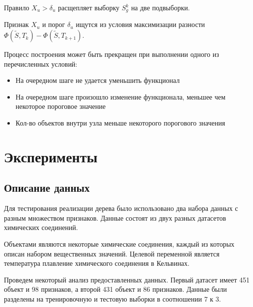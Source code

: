 \documentclass{article}
\begin{document}
Правило $X_u > \delta_u$ расщепляет выборку $S_g^k$ на две подвыборки.

Признак $X_u$ и порог $\delta_u$ ищутся из условия максимизации разности $\Phi(\tilde{S}, T_k) - \Phi(\tilde{S}, T_{k + 1})$.

Процесс построения может быть прекращен при выполнении одного из перечисленных условий:

\begin{itemize}
	\item На очередном шаге не удается уменьшить функционал
	\item На очередном шаге произошло изменение функционала, меньшее чем некоторое пороговое значение
	\item Кол-во объектов внутри узла меньше некоторого порогового значения
\end{itemize}


\section{Эксперименты}
\label{sec:headings}

\subsection{Описание данных}

Для тестирования реализации дерева было использовано два набора данных с разным множеством признаков. Данные состоят из двух разных датасетов химических соединений.

Объектами являются некоторые химические соединения, каждый из которых описан набором вещественных значений. Целевой переменной является температура плавление химического соединения в Кельвинах.

Проведем некоторый анализ предоставленных данных. Первый датасет имеет 451 объект и 98 признаков, а второй 431 объект и 86 признаков. Данные были разделены на тренировочную и тестовую выборки в соотношении 7 к 3.
\end{document}
